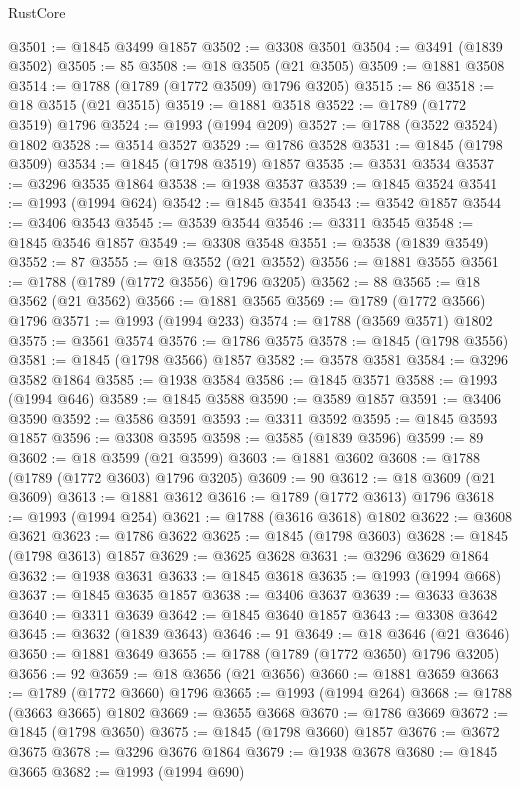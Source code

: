\begin{lexlean}{RustCore}
\begin{coremodule}
@3501 := @1845 @3499 @1857
@3502 := @3308 @3501
@3504 := @3491 (@1839 @3502)
@3505 := 85
@3508 := @18 @3505 (@21 @3505)
@3509 := @1881 @3508
@3514 := @1788 (@1789 (@1772 @3509) @1796 @3205)
@3515 := 86
@3518 := @18 @3515 (@21 @3515)
@3519 := @1881 @3518
@3522 := @1789 (@1772 @3519) @1796
@3524 := @1993 (@1994 @209)
@3527 := @1788 (@3522 @3524) @1802
@3528 := @3514 @3527
@3529 := @1786 @3528
@3531 := @1845 (@1798 @3509)
@3534 := @1845 (@1798 @3519) @1857
@3535 := @3531 @3534
@3537 := @3296 @3535 @1864
@3538 := @1938 @3537
@3539 := @1845 @3524
@3541 := @1993 (@1994 @624)
@3542 := @1845 @3541
@3543 := @3542 @1857
@3544 := @3406 @3543
@3545 := @3539 @3544
@3546 := @3311 @3545
@3548 := @1845 @3546 @1857
@3549 := @3308 @3548
@3551 := @3538 (@1839 @3549)
@3552 := 87
@3555 := @18 @3552 (@21 @3552)
@3556 := @1881 @3555
@3561 := @1788 (@1789 (@1772 @3556) @1796 @3205)
@3562 := 88
@3565 := @18 @3562 (@21 @3562)
@3566 := @1881 @3565
@3569 := @1789 (@1772 @3566) @1796
@3571 := @1993 (@1994 @233)
@3574 := @1788 (@3569 @3571) @1802
@3575 := @3561 @3574
@3576 := @1786 @3575
@3578 := @1845 (@1798 @3556)
@3581 := @1845 (@1798 @3566) @1857
@3582 := @3578 @3581
@3584 := @3296 @3582 @1864
@3585 := @1938 @3584
@3586 := @1845 @3571
@3588 := @1993 (@1994 @646)
@3589 := @1845 @3588
@3590 := @3589 @1857
@3591 := @3406 @3590
@3592 := @3586 @3591
@3593 := @3311 @3592
@3595 := @1845 @3593 @1857
@3596 := @3308 @3595
@3598 := @3585 (@1839 @3596)
@3599 := 89
@3602 := @18 @3599 (@21 @3599)
@3603 := @1881 @3602
@3608 := @1788 (@1789 (@1772 @3603) @1796 @3205)
@3609 := 90
@3612 := @18 @3609 (@21 @3609)
@3613 := @1881 @3612
@3616 := @1789 (@1772 @3613) @1796
@3618 := @1993 (@1994 @254)
@3621 := @1788 (@3616 @3618) @1802
@3622 := @3608 @3621
@3623 := @1786 @3622
@3625 := @1845 (@1798 @3603)
@3628 := @1845 (@1798 @3613) @1857
@3629 := @3625 @3628
@3631 := @3296 @3629 @1864
@3632 := @1938 @3631
@3633 := @1845 @3618
@3635 := @1993 (@1994 @668)
@3637 := @1845 @3635 @1857
@3638 := @3406 @3637
@3639 := @3633 @3638
@3640 := @3311 @3639
@3642 := @1845 @3640 @1857
@3643 := @3308 @3642
@3645 := @3632 (@1839 @3643)
@3646 := 91
@3649 := @18 @3646 (@21 @3646)
@3650 := @1881 @3649
@3655 := @1788 (@1789 (@1772 @3650) @1796 @3205)
@3656 := 92
@3659 := @18 @3656 (@21 @3656)
@3660 := @1881 @3659
@3663 := @1789 (@1772 @3660) @1796
@3665 := @1993 (@1994 @264)
@3668 := @1788 (@3663 @3665) @1802
@3669 := @3655 @3668
@3670 := @1786 @3669
@3672 := @1845 (@1798 @3650)
@3675 := @1845 (@1798 @3660) @1857
@3676 := @3672 @3675
@3678 := @3296 @3676 @1864
@3679 := @1938 @3678
@3680 := @1845 @3665
@3682 := @1993 (@1994 @690)

\end{coremodule}
\end{lexlean}
